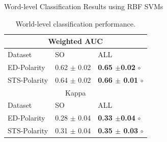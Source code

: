 \documentclass[handout]{beamer}
\begin{document}
\begin{frame}{Word-level Classification Results using RBF SVMs}
\footnotesize
\begin{table}[!htb]
\begin{center}
\begin{tabular}{l|l|l}
\hline \hline
\multicolumn{ 3}{c}{Weighted AUC } \\ \hline \hline
Dataset & SO & ALL \\ \hline
ED-Polarity & 0.62 $\pm$ 0.02 &  \textbf{0.65 $\pm$0.02} $\circ$ \\ 
STS-Polarity & 0.64 $\pm$ 0.02 & \textbf{0.66 $\pm$ 0.01} $\circ$   \\ \hline 
\hline \hline
\multicolumn{ 3}{c}{Kappa} \\ \hline \hline
Dataset & SO & ALL \\ \hline
ED-Polarity & 0.28 $\pm$ 0.04 &  \textbf{0.33 $\pm$0.04} $\circ$ \\ 
STS-Polarity & 0.31 $\pm$ 0.04 & \textbf{0.35 $\pm$ 0.03} $\circ$   \\ \hline 


\end{tabular}
\end{center}
\caption{World-level classification performance.} 
\label{tab:classres}
\end{table}


\end{frame}
\end{document}
